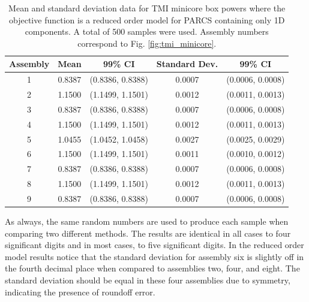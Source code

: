 %
\begin{table}[!htb] 
\caption{\label{table:tmi_mean_sd_1d} 
Mean and standard deviation data for \ac{TMI} minicore box powers where the objective function is a reduced order model for \ac{PARCS} containing only 1D components. A total of 500 samples were used. Assembly numbers correspond to Fig. \ref{fig:tmi_minicore}.}
\centering
\begin{tabular}{||c|c|c|c|c||} 
\hline \hline
\textbf{Assembly} & \textbf{Mean} & \textbf{99\% CI} & \textbf{Standard Dev.} & \textbf{99\% CI} \\ \hline
1 & 0.8387 & (0.8386, 0.8388) & 0.0007 & (0.0006, 0.0008) \\ \hline 
2 & 1.1500 & (1.1499, 1.1501) & 0.0012 & (0.0011, 0.0013) \\ \hline
3 & 0.8387 & (0.8386, 0.8388) & 0.0007 & (0.0006, 0.0008) \\ \hline
4 & 1.1500 & (1.1499, 1.1501) & 0.0012 & (0.0011, 0.0013) \\ \hline
5 & 1.0455 & (1.0452, 1.0458) & 0.0027 & (0.0025, 0.0029) \\ \hline
6 & 1.1500 & (1.1499, 1.1501) & 0.0011 & (0.0010, 0.0012) \\ \hline
7 & 0.8387 & (0.8386, 0.8388) & 0.0007 & (0.0006, 0.0008) \\ \hline
8 & 1.1500 & (1.1499, 1.1501) & 0.0012 & (0.0011, 0.0013) \\ \hline
9 & 0.8387 & (0.8386, 0.8388) & 0.0007 & (0.0006, 0.0008) \\
\hline \hline
\end{tabular}
\end{table}
%
As always, the same random numbers are used to produce each sample when comparing two different methods. The results are identical in all cases to four significant digits and in most cases, to five significant digits. In the reduced order model results notice that the standard deviation for assembly six is slightly off in the fourth decimal place when compared to assemblies two, four, and eight. The standard deviation should be equal in these four assemblies due to symmetry, indicating the presence of roundoff error.        

